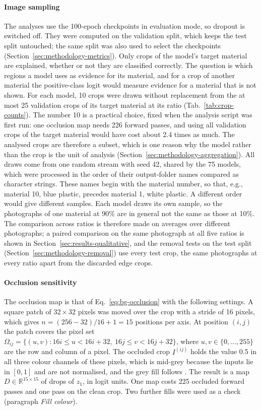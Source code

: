 \paragraph{Image sampling}
\label{sec:methodology-sampling}
The analyses use the 100-epoch checkpoints in evaluation mode, so dropout is switched
off. They were computed on the validation split, which keeps the test split
untouched; the same split was also used to select the checkpoints (Section~\ref{sec:methodology-metrics}). Only
crops of the model's target material are explained, whether or not they are
classified correctly. The question is which regions a model uses as evidence for its
material, and for a crop of another material the positive-class logit would measure
evidence for a material that is not shown. For each model, 10 crops were drawn without
replacement from the at most 25 validation crops of its target material at its ratio
(Tab.~\ref{tab:crop-counts}). The number 10 is a practical choice, fixed when the
analysis script was first run: one occlusion map needs 226 forward passes, and using
all validation crops of the target material would have cost about 2.4 times as much.
The analysed crops are therefore a subset, which is one reason why the model rather
than the crop is the unit of analysis (Section~\ref{sec:methodology-aggregation}). All
draws come from one random stream with seed 42, shared by the 75 models, which were
processed in the order of their output-folder names compared as character strings.
These names begin with the material number, so that, e.g., material 10, blue plastic,
precedes material 1, white plastic. A different order
would give different samples. Each model draws its own sample, so the
photographs of one material at 90\% are in general not the same as those at 10\%. The
comparison across ratios is therefore made on averages over different photographs; a
paired comparison on the same photograph at all five ratios is shown in
Section~\ref{sec:results-qualitative}, and the removal tests on the test split
(Section~\ref{sec:methodology-removal}) use every test crop, the same photographs at every
ratio apart from the discarded edge crops.

\paragraph{Occlusion sensitivity}
\label{sec:methodology-occlusion-impl}
The occlusion map is that of Eq.~\eqref{eq:bg-occlusion} with the following settings.
A square patch of $32 \times 32$ pixels was moved over the crop with a stride of 16
pixels, which gives $n = (256 - 32)/16 + 1 = 15$ positions per axis. At position
$(i, j)$ the patch covers the pixel set
$\Omega_{ij} = \{(u, v) : 16i \le u < 16i + 32,\ 16j \le v < 16j + 32\}$, where
$u, v \in \{0, \dots, 255\}$ are the row and column of a pixel. The occluded crop
$I^{(ij)}$ holds the value 0.5 in all three colour channels of these pixels, which is
mid-grey because the inputs lie in $[0,1]$ and are not normalised, and the grey fill
follows \citet{zeilerFergus2014}. The result is a map $D \in \mathbb{R}^{15 \times 15}$
of drops of $z_1$, in logit units. One map costs 225 occluded forward passes and one
pass on the clean crop. Two further fills were used as a check (paragraph \emph{Fill
colour}).

